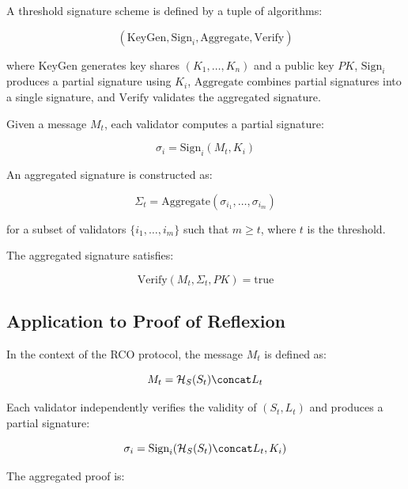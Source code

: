 A threshold signature scheme is defined by a tuple of algorithms:

\begin{equation}
(\text{KeyGen}, \text{Sign}_i, \text{Aggregate}, \text{Verify})
\end{equation}

where $\text{KeyGen}$ generates key shares $(K_1, \dots, K_n)$ and a public key $PK$, $\text{Sign}_i$ produces a partial signature using $K_i$, $\text{Aggregate}$ combines partial signatures into a single signature, and $\text{Verify}$ validates the aggregated signature.

Given a message $M_t$, each validator computes a partial signature:

\begin{equation}
\sigma_i = \text{Sign}_i(M_t, K_i)
\end{equation}

An aggregated signature is constructed as:

\begin{equation}
\Sigma_t = \text{Aggregate}(\sigma_{i_1}, \dots, \sigma_{i_m})
\end{equation}

for a subset of validators $\{i_1, \dots, i_m\}$ such that $m \geq t$, where $t$ is the threshold.

The aggregated signature satisfies:

\begin{equation}
\text{Verify}(M_t, \Sigma_t, PK) = \text{true}
\end{equation}

\subsection{Application to Proof of Reflexion}

In the context of the RCO protocol, the message $M_t$ is defined as:

\begin{equation}
M_t = \mathcal{H}_S(S_t) \concat L_t
\end{equation}

Each validator independently verifies the validity of $(S_t, L_t)$ and produces a partial signature:

\begin{equation}
\sigma_i = \text{Sign}_i(\mathcal{H}_S(S_t) \concat L_t, K_i)
\end{equation}

The aggregated proof is:

